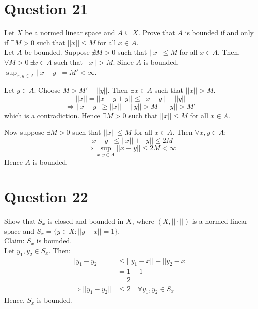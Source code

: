 \documentclass{article}
\begin{document}
\section{Question 21}

	Let $X$ be a normed linear space and $A \subseteq X$.
	Prove that $A$ is bounded if and only if $\exists M > 0$ such that $||x|| \le M$ for
	all $x \in A$. \\

	Let $A$ be bounded.
	Suppose $\nexists M > 0$ such that $||x|| \le M$ for all $x \in A$.
	Then, $\forall M > 0 ~ \exists x \in A$ such that $||x|| > M$.
	Since $A$ is bounded, $\sup_{x, y \in A} ||x - y|| = M' < \infty$.

	Let $y \in A$.
	Choose $M > M' + ||y||$.
	Then $\exists x \in A$ such that $||x|| > M$.
	\[ ||x|| = ||x - y + y|| \le ||x - y|| + ||y|| \]
	\[ \Rightarrow ||x - y|| \ge ||x|| - ||y|| > M - ||y|| > M' \]
	which is a contradiction.
	Hence $\exists M > 0$ such that $||x|| \le M$ for all $x \in A$.

	Now suppose $\exists M > 0$ such that $||x|| \le M$ for all $x \in A$.
	Then $\forall x, y \in A$:
	\[ ||x - y|| \le ||x|| + ||y|| \le 2M \]
	\[ \Rightarrow \sup_{x, y \in A} ||x - y|| \le 2M < \infty \]
	Hence $A$ is bounded.

\section{Question 22}

	Show that $S_x$ is closed and bounded in $X$, where $(X, ||\cdot||)$ is a normed linear space
	and $S_x = \{y \in X: ||y - x|| = 1\}$. \\

	Claim: $S_x$ is bounded. \\
	Let $y_1, y_2 \in S_x$.
	Then:
	\begin{align*}
		||y_1 - y_2|| &\le ||y_1 - x|| + ||y_2 - x|| \\
		&= 1 + 1 \\
		&= 2 \\
		\Rightarrow ||y_1 - y_2|| &\le 2 \quad \forall y_1, y_2 \in S_x
	\end{align*}
	Hence, $S_x$ is bounded.
\end{document}
